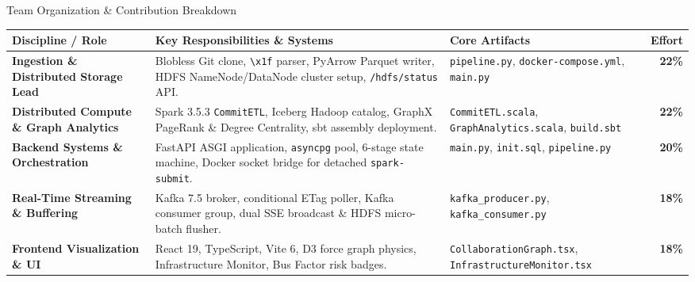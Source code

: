 \documentclass[aspectratio=169, 10pt]{beamer}
\begin{document}
\begin{frame}{Team Organization \& Contribution Breakdown}
  \begin{table}
    \centering
    \scriptsize
    \begin{tabularx}{\textwidth}{p{3.2cm} p{5.5cm} p{3.2cm} r}
      \toprule
      \textbf{Discipline / Role} & \textbf{Key Responsibilities \& Systems} & \textbf{Core Artifacts} & \textbf{Effort} \\
      \midrule
      \textbf{Ingestion \& Distributed Storage Lead} & Blobless Git clone, \texttt{\textbackslash x1f} parser, PyArrow Parquet writer, HDFS NameNode/DataNode cluster setup, \texttt{/hdfs/status} API. & \texttt{pipeline.py}, \texttt{docker-compose.yml}, \texttt{main.py} & \textbf{22\%} \\
      \addlinespace
      \textbf{Distributed Compute \& Graph Analytics} & Spark 3.5.3 \texttt{CommitETL}, Iceberg Hadoop catalog, GraphX PageRank \& Degree Centrality, sbt assembly deployment. & \texttt{CommitETL.scala}, \texttt{GraphAnalytics.scala}, \texttt{build.sbt} & \textbf{22\%} \\
      \addlinespace
      \textbf{Backend Systems \& Orchestration} & FastAPI ASGI application, \texttt{asyncpg} pool, 6-stage state machine, Docker socket bridge for detached \texttt{spark-submit}. & \texttt{main.py}, \texttt{init.sql}, \texttt{pipeline.py} & \textbf{20\%} \\
      \addlinespace
      \textbf{Real-Time Streaming \& Buffering} & Kafka 7.5 broker, conditional ETag poller, Kafka consumer group, dual SSE broadcast \& HDFS micro-batch flusher. & \texttt{kafka\_producer.py}, \texttt{kafka\_consumer.py} & \textbf{18\%} \\
      \addlinespace
      \textbf{Frontend Visualization \& UI} & React 19, TypeScript, Vite 6, D3 force graph physics, Infrastructure Monitor, Bus Factor risk badges. & \texttt{CollaborationGraph.tsx}, \texttt{InfrastructureMonitor.tsx} & \textbf{18\%} \\
      \bottomrule
    \end{tabularx}
  \end{table}
\end{frame}
\end{document}
